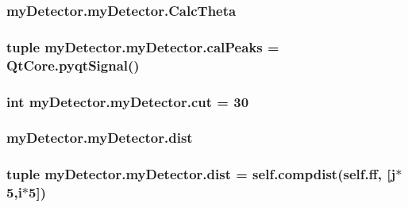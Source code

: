 \hypertarget{classmy_detector_1_1my_detector_ae8662acfdbb97b09a6a94523c1181c4e}{
\subsubsection[{Calc\-Theta}]{\setlength{\rightskip}{0pt plus 5cm}my\-Detector.\-my\-Detector.\-Calc\-Theta}}\label{classmy_detector_1_1my_detector_ae8662acfdbb97b09a6a94523c1181c4e}
\hypertarget{classmy_detector_1_1my_detector_a56d596ddc38ea76426625c66e958f597}{
\subsubsection[{cal\-Peaks}]{\setlength{\rightskip}{0pt plus 5cm}tuple my\-Detector.\-my\-Detector.\-cal\-Peaks = Qt\-Core.\-pyqt\-Signal()\hspace{0.3cm}{\ttfamily [static]}}}\label{classmy_detector_1_1my_detector_a56d596ddc38ea76426625c66e958f597}
\hypertarget{classmy_detector_1_1my_detector_ae401cd79076e16e17387d857aa582485}{
\subsubsection[{cut}]{\setlength{\rightskip}{0pt plus 5cm}int my\-Detector.\-my\-Detector.\-cut = 30\hspace{0.3cm}{\ttfamily [static]}}}\label{classmy_detector_1_1my_detector_ae401cd79076e16e17387d857aa582485}
\hypertarget{classmy_detector_1_1my_detector_a2246cf4b56f098e953bad790b34f668f}{
\subsubsection[{dist}]{\setlength{\rightskip}{0pt plus 5cm}my\-Detector.\-my\-Detector.\-dist}}\label{classmy_detector_1_1my_detector_a2246cf4b56f098e953bad790b34f668f}
\hypertarget{classmy_detector_1_1my_detector_a043b9a79c751351b6d34bcf8f0d415ca}{
\subsubsection[{dist}]{\setlength{\rightskip}{0pt plus 5cm}tuple my\-Detector.\-my\-Detector.\-dist = self.\-compdist(self.\-ff, \mbox{[}j$\ast$5,i$\ast$5\mbox{]})\hspace{0.3cm}{\ttfamily [static]}}}\label{classmy_detector_1_1my_detector_a043b9a79c751351b6d34bcf8f0d415ca}
